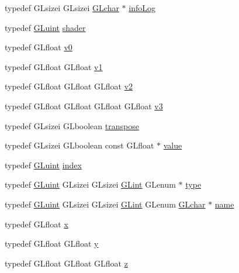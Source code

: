 \begin{DoxyCompactItemize}
\item 
typedef G\+Lsizei G\+Lsizei \hyperlink{namespacetrimesh_ae0c0512592dbcadf9b11efef0409d165}{G\+Lchar} $\ast$ \hyperlink{namespacetrimesh_a98d16a04665554edfd8d50cb1ea434ce}{info\+Log}
\item 
typedef \hyperlink{namespacetrimesh_ad2289423ef47b393854afc30451d433b}{G\+Luint} \hyperlink{namespacetrimesh_ad4924c86524ecb5ebcbc84cc71eee0f6}{shader}
\item 
typedef G\+Lfloat \hyperlink{namespacetrimesh_a240b3c8ea9cf01bd707862b32fa26dff}{v0}
\item 
typedef G\+Lfloat G\+Lfloat \hyperlink{namespacetrimesh_a02cc42cb0e29e66e5488b53767461f68}{v1}
\item 
typedef G\+Lfloat G\+Lfloat G\+Lfloat \hyperlink{namespacetrimesh_ad2ea56e3e595d59c8a18c524465c1906}{v2}
\item 
typedef G\+Lfloat G\+Lfloat G\+Lfloat G\+Lfloat \hyperlink{namespacetrimesh_af1de508e9256fa7722bbb44bb7788a89}{v3}
\item 
typedef G\+Lsizei G\+Lboolean \hyperlink{namespacetrimesh_af31d9992cd459bbcf8e2705cb9b541f4}{transpose}
\item 
typedef G\+Lsizei G\+Lboolean const G\+Lfloat $\ast$ \hyperlink{namespacetrimesh_ab10cc1052c9d1d1376d92211b6ca27dd}{value}
\item 
typedef \hyperlink{namespacetrimesh_ad2289423ef47b393854afc30451d433b}{G\+Luint} \hyperlink{namespacetrimesh_a667dc2743bc31f46137f6d941c9ebf5e}{index}
\item 
typedef \hyperlink{namespacetrimesh_ad2289423ef47b393854afc30451d433b}{G\+Luint} G\+Lsizei G\+Lsizei \hyperlink{namespacetrimesh_aeccc290e30b317c861fb146956528187}{G\+Lint} G\+Lenum $\ast$ \hyperlink{namespacetrimesh_aa726c5bf9cff74a26269e8d258ae9e3d}{type}
\item 
typedef \hyperlink{namespacetrimesh_ad2289423ef47b393854afc30451d433b}{G\+Luint} G\+Lsizei G\+Lsizei \hyperlink{namespacetrimesh_aeccc290e30b317c861fb146956528187}{G\+Lint} G\+Lenum \hyperlink{namespacetrimesh_ae0c0512592dbcadf9b11efef0409d165}{G\+Lchar} $\ast$ \hyperlink{namespacetrimesh_a7f24cdcfa73387d7fa6aa44676238a79}{name}
\item 
typedef G\+Lfloat \hyperlink{namespacetrimesh_a3365d1b1a1bc5d8e9c844cf589a8c4a8}{x}
\item 
typedef G\+Lfloat G\+Lfloat \hyperlink{namespacetrimesh_a56b35d0eb7039be92fcc4867080c7419}{y}
\item 
typedef G\+Lfloat G\+Lfloat G\+Lfloat \hyperlink{namespacetrimesh_a42d0d86cc8db1d2be48121fe5e52fc67}{z}

\end{DoxyCompactItemize}
